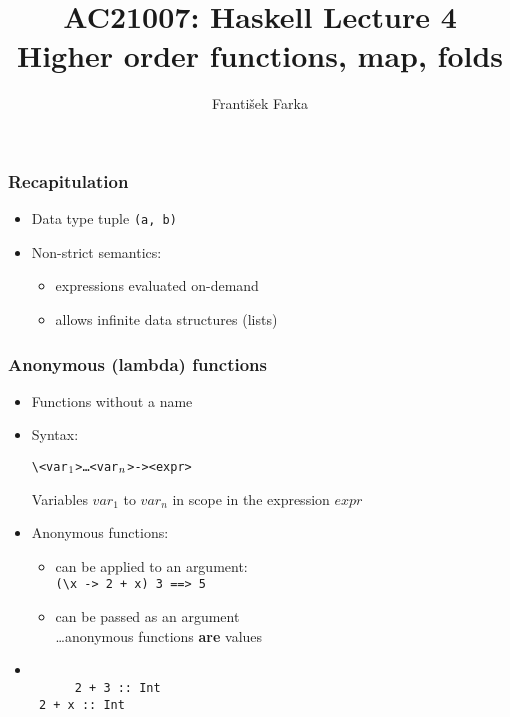 \documentclass[final,handout]{beamer}
\title[Haskell Lecture 3: TBD]{AC21007: Haskell Lecture 4\\
    Higher order functions, map, folds
}
\author[Franti\v{s}ek Farka]{Franti\v{s}ek Farka}
\date{}
\newcommand\BackgroundPicture[1]{%
  \setbeamertemplate{background}{%
   \parbox[c][\paperheight]{\paperwidth}{%
      \vfill \hfill
\texttt{[image: \#1]}
        \hfill \vfill
     }}}
\begin{document}
\BackgroundPicture{fondo1.png}
\begin{frame}
\titlepage
\end{frame}

\begin{frame}[fragile]
    \frametitle{Recapitulation}

    \begin{itemize}
        \item Data type tuple \texttt{(a, b)}
        \item Non-strict semantics:
            \begin{itemize}
                    \item expressions evaluated on-demand
                    \item allows infinite data structures (lists)
            \end{itemize}
  \end{itemize}
\end{frame}  





\begin{frame}[fragile]
    \frametitle{Anonymous (lambda) functions}

    \begin{itemize}
        \item<4-> Functions without a name
        \item<4->  Syntax:
            \begin{alltt}
    \textbackslash{}<var\(\sb{1}\)> \dots <var\(\sb{n}\)> -> <expr>
            \end{alltt}
        Variables $var_1$ to $var_n$ in scope in the expression $expr$
            
        \item<5-> Anonymous functions:
            
            \begin{itemize}
                \item<6-> can be applied to an argument:\\
                    \texttt{(\textbackslash x -> 2 + x) 3 ==> 5}
                \item<7-> can be passed as an argument \\
                        \dots anonymous functions \textbf{are} values
            \end{itemize}

        \item<2-> \\
    \texttt{                ~~~~~2 + 3 :: Int}\\
    \texttt{ 2 + x ::  Int}\\
    \texttt{}

    \end{itemize}

\end{frame}
\end{document}
